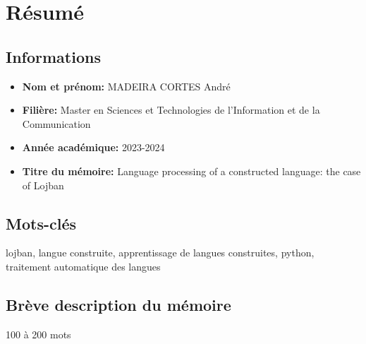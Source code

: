 \section*{Résumé} %
\label{sec:resume}

\subsection*{Informations}

\begin{itemize}
    \setlength\itemsep{0.1em}
    \item \textbf{Nom et prénom:} MADEIRA CORTES André
    \item \textbf{Filière:} Master en Sciences et Technologies de l'Information et de la Communication
    \item \textbf{Année académique:} 2023-2024
    \item \textbf{Titre du mémoire:} Language processing of a constructed language: the case of Lojban
\end{itemize}

\subsection*{Mots-clés}

lojban, langue construite, apprentissage de langues construites, python, traitement automatique des langues

\subsection*{Brève description du mémoire}

100 à 200 mots